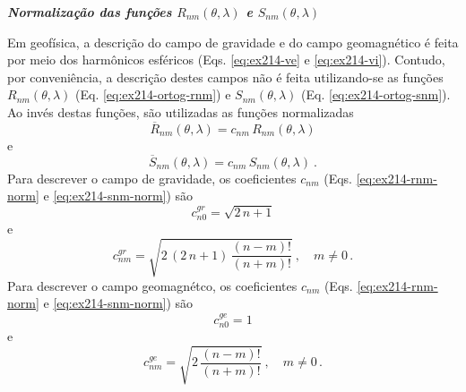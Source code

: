 \documentclass[10pt,a4paper,fleqn]{article}
\begin{document}
\begin{flushleft}
\emph{\textbf{Normalizaç\~{a}o das funç\~{o}es $R_{nm}(\theta, \lambda)$ e $S_{nm}(\theta, \lambda)$}}
\end{flushleft}

\bigskip
\bigskip

Em geof\'{i}sica, a descriç\~{a}o do campo de gravidade e do campo geomagn\'{e}tico \'{e} feita por
meio dos harm\^{o}nicos esf\'{e}ricos (Eqs. \ref{eq:ex214-ve} e \ref{eq:ex214-vi}). Contudo, por 
conveni\^{e}ncia, a descriç\~{a}o destes campos n\~{a}o \'{e} feita utilizando-se as funç\~{o}es 
$R_{nm}(\theta, \lambda)$ (Eq. \ref{eq:ex214-ortog-rnm}) e $S_{nm}(\theta, \lambda)$ 
(Eq. \ref{eq:ex214-ortog-snm}). Ao inv\'{e}s destas funç\~{o}es, s\~{a}o utilizadas as funç\~{o}es 
normalizadas
\begin{equation}
\overline{R}_{nm}(\theta,\lambda) = c_{nm} \, R_{nm}(\theta,\lambda)
\label{eq:ex214-rnm-norm}
\end{equation}
e
\begin{equation}
\overline{S}_{nm}(\theta,\lambda) = c_{nm} \, S_{nm}(\theta,\lambda) \: .
\label{eq:ex214-snm-norm}
\end{equation}
Para descrever o campo de gravidade, os coeficientes $c_{nm}$ 
(Eqs. \ref{eq:ex214-rnm-norm} e \ref{eq:ex214-snm-norm}) são 
\begin{equation}
c_{n0}^{gr} = \sqrt{2 \, n + 1}
\label{eq:ex214-cn0-grav}
\end{equation}
e
\begin{equation}
c_{nm}^{gr} = \sqrt{2 \, (2 \, n + 1) \, \dfrac{(n - m)!}{(n + m)!}} \: , \quad m \neq 0 \, .
\label{eq:ex214-cnm-grav}
\end{equation}
Para descrever o campo geomagn\'{e}tco, os coeficientes $c_{nm}$ 
(Eqs. \ref{eq:ex214-rnm-norm} e \ref{eq:ex214-snm-norm}) são 
\begin{equation}
c_{n0}^{ge} = 1
\label{eq:ex214-cn0-geom}
\end{equation}
e
\begin{equation}
c_{nm}^{ge} = \sqrt{2 \, \dfrac{(n - m)!}{(n + m)!}} \: , \quad m \neq 0 \, .
\label{eq:ex214-cnm-geom}
\end{equation}

\begin{flushleft}
\dotfill
\end{flushleft}
\end{document}
